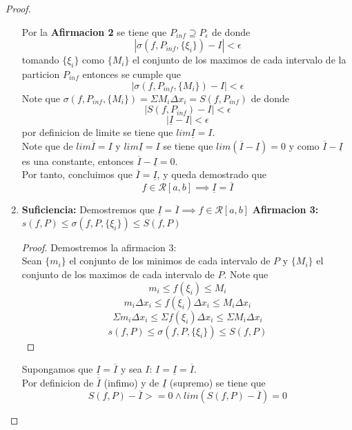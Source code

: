 \documentclass{article}
\begin{document}
\begin{proof}
\begin{enumerate}
Por la \textbf{Afirmacion 2} se tiene que \(P_{inf} \supseteq P_\epsilon\) de donde 
\[
|\sigma(f, P_{inf},\{\xi_i\}) - I| < \epsilon
\]
tomando \(\{\xi_i\}\) como \(\{M_i\}\) el conjunto de los maximos de cada intervalo de la particion \(P_{inf}\) entonces se cumple que
\[
|\sigma(f, P_{inf},\{M_i\}) - I| < \epsilon
\]
Note que \(\sigma(f, P_{inf},\{M_i\}) = \Sigma M_i\Delta x_i = S(f, P_{inf})\) de donde
\[
|S(f, P_{inf}) - I| < \epsilon
\]
\[
|\underline{I} - I| < \epsilon
\]
por definicion de limite se tiene que \(lim\underline{I} = I\).\\

Note que de \(lim\overline{I} = I\) y \(lim\underline{I} = I\) se tiene que \(lim(\overline{I} - \underline{I}) = 0\) y como \(\overline{I} - \underline{I}\) es una constante, entonces \(\overline{I} - \underline{I} = 0\).\\

Por tanto, concluimos que \(\overline{I} = \underline{I}\), y queda demostrado que 
\[f \in \mathcal{R}[a, b] \implies \underline{I} = \overline{I} \]

    \item \textbf{Suficiencia:} Demostremos que \(\underline{I} = \overline{I} \implies f \in \mathcal{R}[a, b]\)
\textbf{Afirmacion 3:} \(s(f, P) \leq \sigma(f, P,\{\xi_i\}) \leq S(f, P)\)
\begin{proof}
Demostremos la afirmacion 3:\\

Sean \(\{m_i\}\) el conjunto de los minimos de cada intervalo de \(P\) y \(\{M_i\}\) el conjunto de los maximos de cada intervalo de \(P\).
Note que 
\[
m_i \leq f(\xi_i) \leq M_i
\]
\[
m_i \Delta x_i \leq f(\xi_i)\Delta x_i \leq M_i\Delta x_i
\] 
\[
\Sigma m_i \Delta x_i \leq \Sigma f(\xi_i)\Delta x_i \leq \Sigma M_i\Delta x_i
\]
\[
s(f, P) \leq \sigma(f, P,\{\xi_i\}) \leq S(f, P)
\]
\end{proof}
Supongamos que  \(\underline{I} = \overline{I}\) y sea \(I\): \(I = \underline{I} = \overline{I}\).\\

Por definicion de \(\overline{I}\) (infimo) y de \(\underline{I}\) (supremo) se tiene que 
\[
S(f, P) - \overline{I} >= 0 \wedge lim (S(f, P) - \overline{I}) = 0
\]


\end{enumerate}
\end{proof}
\end{document}

